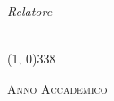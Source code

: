 \begin{titlepage}
\begin{center}
\begin{normalsize}
            \vspace{-48pt}
            
            \begin{flushright}
                \textit{Relatore}\\
                \profTitle\ \myProf
            \end{flushright}
        \end{normalsize}

        \vspace*{\fill}
        
        \line(1, 0){338} \\
        \begin{normalsize}
            \textsc{Anno Accademico \myAA}
        \end{normalsize}
    \end{center}
\end{titlepage}